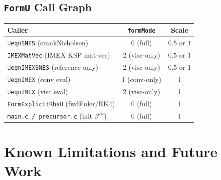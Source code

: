 \documentclass[12pt,a4paper]{article}
\begin{document}
	\subsection{\texttt{FormU} Call Graph}
	
	\begin{center}
		\begin{tabular}{lcc}
			\toprule
			Caller & \texttt{formMode} & Scale \\
			\midrule
			\texttt{UeqnSNES} (crankNicholson) & 0 (full) & $0.5$ or $1$ \\
			\texttt{IMEXMatVec} (IMEX KSP mat-vec) & 2 (visc-only) & $0.5$ or $1$ \\
			\texttt{UeqnIMEXSNES} (reference only) & 2 (visc-only) & $0.5$ or $1$ \\
			\texttt{UeqnIMEX} (conv eval) & 1 (conv-only) & 1 \\
			\texttt{UeqnIMEX} (visc eval) & 2 (visc-only) & 1 \\
			\texttt{FormExplicitRhsU} (fwdEuler/RK4) & 0 (full) & 1 \\
			\texttt{main.c / precursor.c} (init $\mathcal{F}^n$) & 0 (full) & 1 \\
			\bottomrule
		\end{tabular}
	\end{center}
	
	\section{Known Limitations and Future Work}
	
\end{document}
